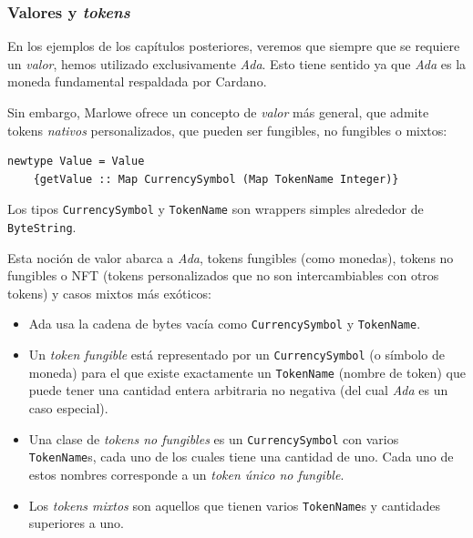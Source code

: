 \documentclass[12pt]{book}
\begin{document}
\subsubsection{Valores y \textit{tokens}}
En los ejemplos de los capítulos posteriores, veremos que siempre que se requiere un \textit{valor}, hemos utilizado exclusivamente \textit{Ada}. Esto tiene sentido ya que \textit{Ada} es la moneda fundamental respaldada por Cardano.

Sin embargo, Marlowe ofrece un concepto de \textit{valor} más general, que admite tokens \textit{nativos} personalizados, que pueden ser fungibles, no fungibles o mixtos:

\begin{lstlisting}[style=Haskell-cardano, caption=Definicion del tipo \texttt{Value}]
newtype Value = Value
    {getValue :: Map CurrencySymbol (Map TokenName Integer)}
\end{lstlisting}

Los tipos \texttt{CurrencySymbol} y \texttt{TokenName} son wrappers simples alrededor de \texttt{ByteString}.


Esta noción de valor abarca a \textit{Ada}, tokens fungibles (como monedas), tokens no fungibles o NFT (tokens personalizados que no son intercambiables con otros tokens) y casos mixtos más exóticos:

\begin{itemize}
    \item Ada usa la cadena de bytes vacía como \texttt{CurrencySymbol} y \texttt{TokenName}.

    \item Un \textit{token fungible} está representado por un \texttt{CurrencySymbol} (o símbolo de moneda) para el que existe exactamente un \texttt{TokenName} (nombre de token) que puede tener una cantidad entera arbitraria no negativa (del cual \textit{Ada} es un caso especial).

    \item Una clase de \textit{tokens no fungibles} es un \texttt{CurrencySymbol} con varios \texttt{TokenName}s, cada uno de los cuales tiene una cantidad de uno. Cada uno de estos nombres corresponde a un \textit{token único no fungible}.

    \item Los \textit{tokens mixtos} son aquellos que tienen varios \texttt{TokenName}s y cantidades superiores a uno.

\end{itemize}
\end{document}
